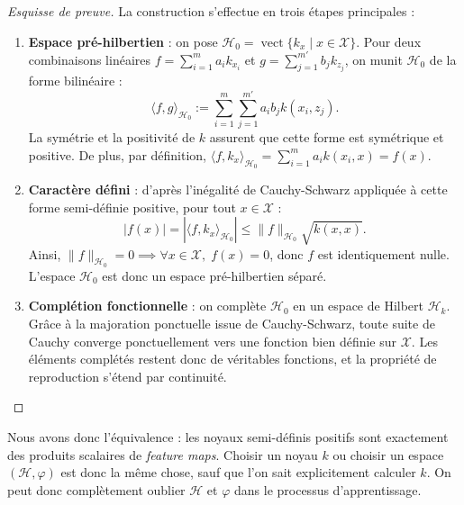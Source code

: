 \begin{proof}[Esquisse de preuve]
    La construction s'effectue en trois étapes principales :
    \begin{enumerate}
        \item \textbf{Espace pré-hilbertien} : on pose $\mathcal{H}_0 = \operatorname{vect}\{k_x \mid x \in \mathcal{X}\}$. Pour deux combinaisons linéaires $f = \sum_{i=1}^m a_i k_{x_i}$ et $g = \sum_{j=1}^{m'} b_j k_{z_j}$, on munit $\mathcal{H}_0$ de la forme bilinéaire :
        \begin{equation*}
            \langle f, g \rangle_{\mathcal{H}_0} := \sum_{i=1}^m \sum_{j=1}^{m'} a_i b_j k(x_i, z_j).
        \end{equation*}
        La symétrie et la positivité de $k$ assurent que cette forme est symétrique et positive. De plus, par définition, $\langle f, k_x \rangle_{\mathcal{H}_0} = \sum_{i=1}^m a_i k(x_i, x) = f(x)$.
        
        \item \textbf{Caractère défini} : d'après l'inégalité de Cauchy-Schwarz appliquée à cette forme semi-définie positive, pour tout $x \in \mathcal{X}$ :
        \begin{equation*}
            |f(x)| = |\langle f, k_x \rangle_{\mathcal{H}_0}| \leqslant \|f\|_{\mathcal{H}_0} \sqrt{k(x, x)}.
        \end{equation*}
        Ainsi, $\|f\|_{\mathcal{H}_0} = 0 \implies \forall x \in \mathcal{X}, \; f(x) = 0$, donc $f$ est identiquement nulle. L'espace $\mathcal{H}_0$ est donc un espace pré-hilbertien séparé.
        
        \item \textbf{Complétion fonctionnelle} : on complète $\mathcal{H}_0$ en un espace de Hilbert $\mathcal{H}_k$. Grâce à la majoration ponctuelle issue de Cauchy-Schwarz, toute suite de Cauchy converge ponctuellement vers une fonction bien définie sur $\mathcal{X}$. Les éléments complétés restent donc de véritables fonctions, et la propriété de reproduction s'étend par continuité.
    \end{enumerate}
\end{proof}

Nous avons donc l'équivalence : les noyaux semi-définis positifs sont exactement des produits scalaires de \emph{feature maps}. Choisir un noyau $k$ ou choisir un espace $( \mathcal{H}, \varphi)$ est donc la même chose, sauf que l'on sait explicitement calculer $k$. On peut donc complètement oublier $ \mathcal{H}$ et $ \varphi$ dans le processus d'apprentissage. 

